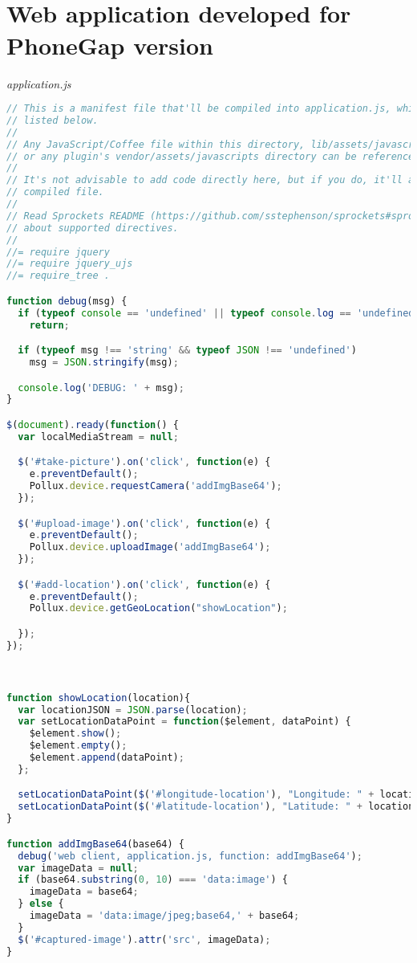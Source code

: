 \section{\\ Web application developed for PhoneGap version} \label{App:AppendixD}
\emph{application.js}
\begin{lstlisting}[language=JavaScript]
// This is a manifest file that'll be compiled into application.js, which will include all the files
// listed below.
//
// Any JavaScript/Coffee file within this directory, lib/assets/javascripts, vendor/assets/javascripts,
// or any plugin's vendor/assets/javascripts directory can be referenced here using a relative path.
//
// It's not advisable to add code directly here, but if you do, it'll appear at the bottom of the
// compiled file.
//
// Read Sprockets README (https://github.com/sstephenson/sprockets#sprockets-directives) for details
// about supported directives.
//
//= require jquery
//= require jquery_ujs
//= require_tree .

function debug(msg) {
  if (typeof console == 'undefined' || typeof console.log == 'undefined')
    return;

  if (typeof msg !== 'string' && typeof JSON !== 'undefined')
    msg = JSON.stringify(msg);

  console.log('DEBUG: ' + msg);
}

$(document).ready(function() {
  var localMediaStream = null;

  $('#take-picture').on('click', function(e) {
    e.preventDefault();
    Pollux.device.requestCamera('addImgBase64');
  });

  $('#upload-image').on('click', function(e) {
    e.preventDefault();
    Pollux.device.uploadImage('addImgBase64');
  });

  $('#add-location').on('click', function(e) {
    e.preventDefault();
    Pollux.device.getGeoLocation("showLocation");

  });
});



function showLocation(location){
  var locationJSON = JSON.parse(location);
  var setLocationDataPoint = function($element, dataPoint) {
    $element.show();
    $element.empty();
    $element.append(dataPoint);
  };

  setLocationDataPoint($('#longitude-location'), "Longitude: " + locationJSON.longitude);
  setLocationDataPoint($('#latitude-location'), "Latitude: " + locationJSON.latitude);
}

function addImgBase64(base64) {
  debug('web client, application.js, function: addImgBase64');
  var imageData = null;
  if (base64.substring(0, 10) === 'data:image') {
    imageData = base64;
  } else {
    imageData = 'data:image/jpeg;base64,' + base64;
  }
  $('#captured-image').attr('src', imageData);
}
\end{lstlisting}

